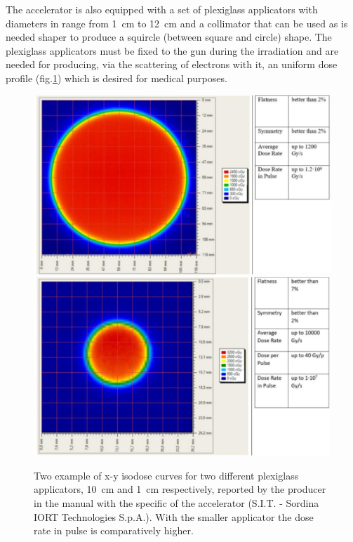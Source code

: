       The accelerator is also equipped with a set of plexiglass applicators with diameters in range from \SI{1}{cm} to \SI{12}{cm} and a collimator that can be used as is needed shaper to produce a squircle (between square and circle) shape.
      The plexiglass applicators must be fixed to the gun during the irradiation and are needed for producing, via the scattering of electrons with it, an uniform dose profile (fig.\ref{fig:dose_profile}) which is desired for medical purposes.
      \begin{figure}[h!]
         \centering
         \includegraphics[width=.49\linewidth]{figures/test_beam/dose_profile_10cm.pdf}
         \includegraphics[width=.49\linewidth]{figures/test_beam/dose_profile_1cm.pdf}
         \caption{Two example of x-y isodose curves for two different plexiglass applicators, \SI{10}{cm} and \SI{1}{cm} respectively, reported by the producer in the manual with the specific of the accelerator (S.I.T. - Sordina IORT Technologies S.p.A.). With the smaller applicator the dose rate in pulse is comparatively higher.}
         \label{fig:dose_profile}
      \end{figure}  

